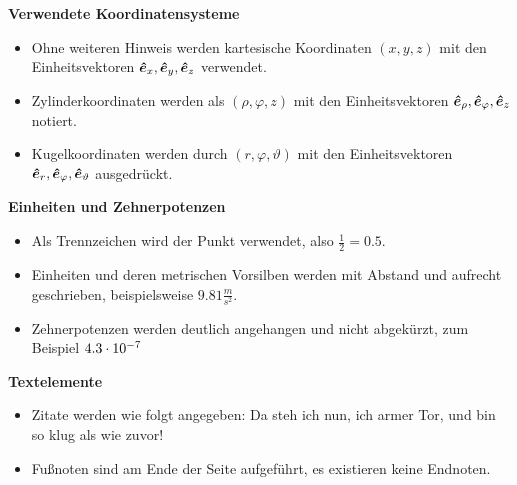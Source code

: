 {\bf Verwendete Koordinatensysteme}
\begin{itemize}
\item Ohne weiteren Hinweis werden kartesische Koordinaten $\left( x,y,z \right)$ mit den Einheitsvektoren $\boldsymbol{\hat e}_{x}, \boldsymbol{\hat e}_{y}, \boldsymbol{\hat e}_{z}$ verwendet.
\item Zylinderkoordinaten werden als $\left( \rho, \varphi, z\right) $ mit den Einheitsvektoren $\boldsymbol{\hat e}_{\rho}, \boldsymbol{\hat e}_{\varphi} , \boldsymbol{\hat e}_{z}$ notiert.
\item Kugelkoordinaten werden durch $\left( r, \varphi, \vartheta \right)$ mit den Einheitsvektoren $\boldsymbol{\hat e}_{r}, \boldsymbol{\hat e}_{\varphi}, \boldsymbol{\hat e}_{\vartheta}$ ausgedr\"uckt. 
\end{itemize}
{\bf Einheiten und Zehnerpotenzen}
\begin{itemize}
\item Als Trennzeichen wird der Punkt verwendet, also $\frac 1 2 = 0.5$.
\item Einheiten und deren metrischen Vorsilben werden mit Abstand und aufrecht geschrieben, beispielsweise $ 9.81 \unit{\frac m{s^2}} $.
\item Zehnerpotenzen werden deutlich angehangen und nicht abgek\"urzt, zum Beispiel $4.3 \cdot 10^{-7} $
\end{itemize}
{\bf Textelemente}
\begin{itemize}
\item Zitate werden wie folgt angegeben: \guillemotright Da steh ich nun, ich armer Tor, und bin so klug als wie zuvor!\guillemotleft
\item Fußnoten sind am Ende der Seite aufgef\"uhrt, es existieren keine Endnoten.
\end{itemize}
